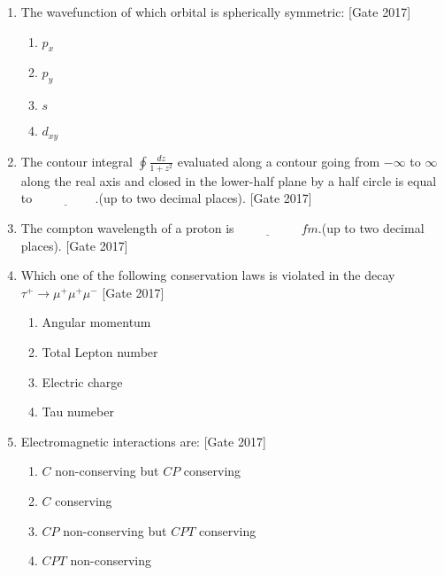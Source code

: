 \documentclass[journal]{IEEEtran}
\begin{document}
\begin{enumerate}
	\item The wavefunction of which orbital is spherically symmetric: \hfill{[Gate 2017]}
\begin{multicols}{4}
	\begin{enumerate}
		\item $p_x$
		\item $p_y$
		\item $s$
		\item $d_{xy}$
	\end{enumerate}
\end{multicols}
	\item The contour integral $\oint \frac{dz}{1+z^2}$ evaluated along a contour going from $- \infty$ to $\infty$ along the real axis and closed in the lower-half plane by a half circle is equal to $\underline{\hspace{2cm}}$.(up to two decimal places). \hfill{[Gate 2017]}
	\item The compton wavelength of a proton is $\underline{\hspace{2cm}}$ $fm$.(up to two decimal places).
	 \hfill{[Gate 2017]}
\item Which one of the following conservation laws is violated in the decay $\tau^{+} \rightarrow \mu^+ \mu^+ \mu^-$ \hfill{[Gate 2017]}
\begin{multicols}{2}
	\begin{enumerate}
		\item Angular momentum
		\item Total Lepton number
		\item Electric charge
		\item Tau numeber
	\end{enumerate}
\end{multicols}
	\item Electromagnetic interactions are: \hfill{[Gate 2017]}
	\begin{multicols}{2}
	\begin{enumerate}
		\item $C$ non-conserving but $CP$ conserving
		\item $C$ conserving 
		\item $CP$ non-conserving but $CPT$ conserving
		\item $CPT$ non-conserving
	\end{enumerate}
\end{multicols}

\end{enumerate}
\end{document}
